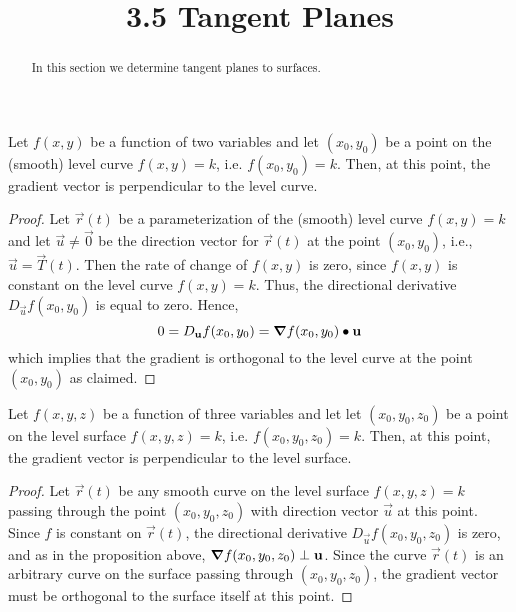 \documentclass[handout]{ximera}
\title{3.5 Tangent Planes}
\begin{document}
\begin{abstract}
In this section we determine tangent planes to surfaces.
\end{abstract}

\maketitle

\begin{proposition}
Let $f(x,y)$ be a function of two variables and let $(x_0, y_0)$ be a point on the (smooth) level curve $f(x,y) = k$, i.e. $f(x_0, y_0) = k$.
Then, at this point, the gradient vector is perpendicular to the level curve.
\end{proposition}
\begin{proof}
Let $\vec r(t)$ be a parameterization of the (smooth) level curve $f(x,y) = k$ and let $\vec u \neq \vec 0$ be the direction 
vector for $\vec r(t)$ at the point $(x_0, y_0)$, i.e., 
$\vec u = \vec T(t)$. Then the rate of change of $f(x,y)$ is zero, since $f(x,y)$ is constant on the level curve $f(x,y) = k$. Thus, the directional derivative
$D_{\vec u} f(x_0, y_0)$ is equal to zero. Hence,
\[
0 = D_{\mathbf u} f(x_0, y_0)  = \boldsymbol\nabla f(x_0, y_0) \bullet \mathbf u
\]
which implies that the gradient is orthogonal to the level curve at the point $(x_0, y_0)$ as claimed.
\end{proof}

\begin{proposition}
Let $f(x,y,z)$ be a function of three variables and let let $(x_0, y_0, z_0)$ be a point on the level surface $f(x,y, z) = k$, i.e. $f(x_0, y_0, z_0) = k$.
Then, at this point, the gradient vector is perpendicular to the level surface.
\end{proposition}
\begin{proof}
Let $\vec r(t)$ be any smooth curve on the level surface $f(x,y, z) = k$ passing through the point $(x_0, y_0, z_0)$ with direction vector $\vec u$ at this point.
Since $f$ is constant on $\vec r(t)$, the directional derivative $D_{\vec u} f(x_0, y_0, z_0)$ is zero, and as in the proposition above, 
$\boldsymbol\nabla f(x_0, y_0, z_0) \perp \mathbf u$.  
Since the curve $\vec r(t)$ is an arbitrary curve on the surface passing through $(x_0, y_0, z_0)$, the gradient vector must be 
orthogonal to the surface itself at this point.
\end{proof}
\end{document}
